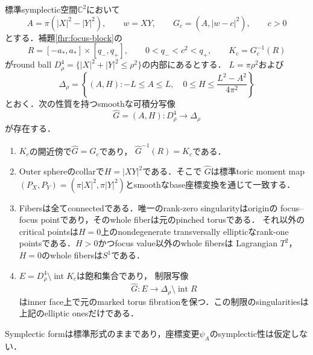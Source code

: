 \begin{theorem}
\label{ncc:normal-ball-completion}
標準symplectic空間$\mathbb C^2$において
\[
 A=\pi(|X|^2-|Y|^2),\qquad w=XY,\qquad
 G_c=(A,|w-c|^2),\qquad c>0
\]
とする．補題\ref{fhr:focus-block}の
\[
 R=[-a_*,a_*]\times[q_-,q_+],\qquad
 0<q_-<c^2<q_+,
 \qquad K_c=G_c^{-1}(R)
\]
がround ball $D^4_\rho=\{|X|^2+|Y|^2\le\rho^2\}$の内部にあるとする．
$L=\pi\rho^2$および
\[
 \Delta_\rho=\left\{(A,H):-L\le A\le L,
       \quad 0\le H\le\frac{L^2-A^2}{4\pi^2}\right\}
\]
とおく．次の性質を持つsmoothな可積分写像
\[
 \widehat G=(A,H):D^4_\rho\longrightarrow\Delta_\rho
\]
が存在する．
\begin{enumerate}
\item $K_c$の開近傍で$\widehat G=G_c$であり，
      $\widehat G^{-1}(R)=K_c$である．
\item Outer sphereのcollarで$H=|XY|^2$である．そこで
      $\widehat G$は標準toric moment map
      $(P_X,P_Y)=(\pi|X|^2,\pi|Y|^2)$とsmoothなbase座標変換を通じて一致する．
\item Fibersは全てconnectedである．唯一のrank-zero singularityはoriginの
      focus--focus pointであり，そのwhole fiberは元のpinched torusである．
      それ以外のcritical pointsは$H=0$上のnondegenerate transversally
      ellipticなrank-one pointsである．$H>0$かつfocus value以外のwhole fibersは
      Lagrangian $T^2$，$H=0$のwhole fibersは$S^1$である．
\item $E=D^4_\rho\setminus\operatorname{int}K_c$は飽和集合であり，
      制限写像
      \[
      \widehat G:E\longrightarrow
      \Delta_\rho\setminus\operatorname{int}R
      \]
      はinner face上で元のmarked torus fibrationを保つ．この制限のsingularitiesは
      上記のelliptic onesだけである．
\end{enumerate}
Symplectic formは標準形式のままであり，座標変更$\psi_A$のsymplectic性は仮定しない．
\end{theorem}

